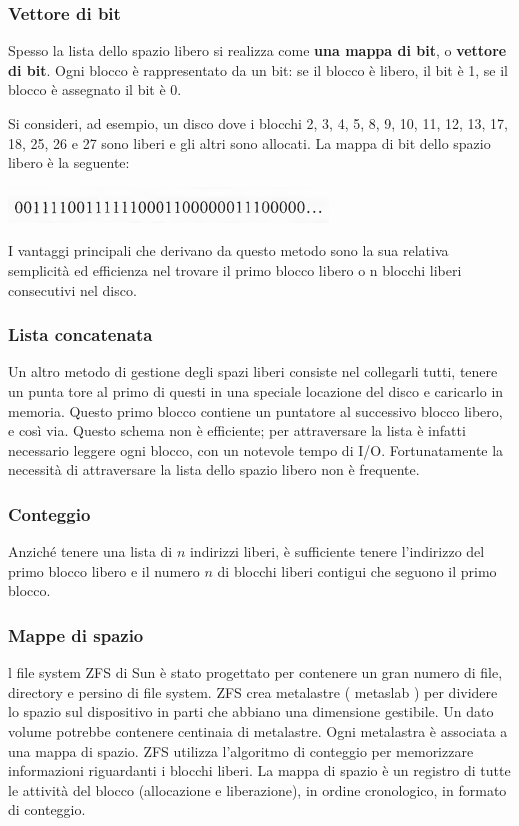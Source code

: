 \documentclass[11pt,a4paper]{article}
\begin{document}
{\subsubsection{Vettore di bit}
Spesso la lista dello spazio libero si realizza come \textbf{una mappa di bit}, o \textbf{vettore di bit}. Ogni
blocco è rappresentato da un bit: se il blocco è libero, il bit è 1, se il blocco è assegnato il
bit è 0.

Si consideri, ad esempio, un disco dove i blocchi 2, 3, 4, 5, 8, 9, 10, 11, 12, 13, 17,
18, 25, 26 e 27 sono liberi e gli altri sono allocati. La mappa di bit dello spazio libero è la se­guente:
\begin{center}
  \includegraphics[scale=0.6]{img/0064.png}
\end{center}
I vantaggi principali che derivano da questo metodo sono la sua relativa semplicità ed effi­cienza nel trovare il primo blocco libero o n blocchi liberi consecutivi nel disco.

\subsubsection{Lista concatenata}
Un altro metodo di gestione degli spazi liberi consiste nel collegarli tutti, tenere un punta­
tore al primo di questi in una speciale locazione del disco e caricarlo in memoria. Questo
primo blocco contiene un puntatore al successivo blocco libero, e così via. Questo schema non è efficiente; per attraversare la lista è infatti necessario leggere
ogni blocco, con un notevole tempo di I/O. Fortunatamente la necessità di attraversare la li­sta dello spazio libero non è frequente.

\subsubsection{Conteggio}
Anziché tenere una lista di $n$ indirizzi liberi, è sufficiente tenere l'indirizzo del primo blocco libero e il numero $n$ di blocchi liberi contigui che seguono il primo blocco.

\subsubsection{Mappe di spazio}
l file system ZFS di Sun è stato progettato per contenere un gran numero di file, directory e
persino di file system. ZFS crea metalastre ( metaslab ) per dividere lo spazio
sul dispositivo in parti che abbiano una dimensione gestibile. Un dato volume potrebbe
contenere centinaia di metalastre. Ogni metalastra è associata a una mappa di spazio. ZFS
utilizza l'algoritmo di conteggio per memorizzare informazioni riguardanti i blocchi liberi.
La mappa di spazio è un registro di tutte le attivi­tà del blocco (allocazione e liberazione), in ordine cronologico, in formato di conteggio.

}
\end{document}
